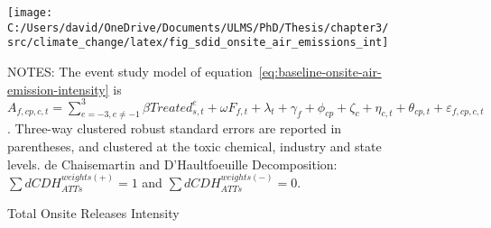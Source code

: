 \begin{figure}[H]
    \centering
    \texttt{[image: C:/Users/david/OneDrive/Documents/ULMS/PhD/Thesis/chapter3/src/climate\_change/latex/fig\_sdid\_onsite\_air\_emissions\_int]}
    \caption{Total Onsite Releases Intensity}
    \label{fig:baseline-onsite-air-emission-intensity}
    \begin{minipage}{\columnwidth}
        \vspace{0.05in}
        \tiny NOTES: The event study model of equation~\ref{eq:baseline-onsite-air-emission-intensity} is $A_{f,cp,c,t} = \sum_{{e = -3},{e \neq -1}}^{3} \beta Treated_{s,t}^e + \omega F_{f,t} + \lambda_{t} + \gamma_{f} + \phi_{cp} + \zeta_{c} + \eta_{c,t} + \theta_{cp,t} + \varepsilon_{f,cp,c,t}$. Three-way clustered robust standard errors are reported in parentheses, and clustered at the toxic chemical, industry and state levels. de Chaisemartin and D'Haultfoeuille Decomposition: $\sum dCDH_{ATTs}^{weights(+)} = 1$ and $\sum dCDH_{ATTs}^{weights(-)} = 0$.
    \end{minipage}
\end{figure}